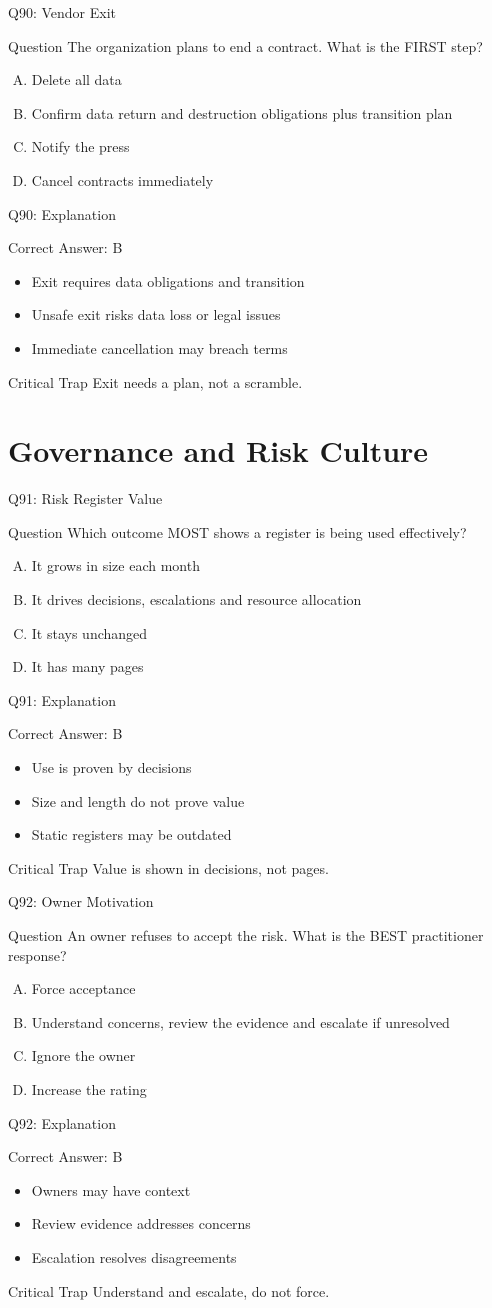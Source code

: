 \documentclass[aspectratio=169]{beamer}
\newcommand{\hq}[7]{%
	\begin{frame}{Q#1: #2}
		\begin{block}{Question}
			#3
		\end{block}
		\begin{enumerate}[(A)]
			#4
		\end{enumerate}
	\end{frame}
	\begin{frame}{Q#1: Explanation}
		\begin{block}{Correct Answer: #5}
			\begin{itemize}
				#6
			\end{itemize}
		\end{block}
		\begin{alertblock}{Critical Trap}
			#7
		\end{alertblock}
	\end{frame}
}
\begin{document}
	\hq{90}{Vendor Exit}
	{The organization plans to end a contract. What is the FIRST step?}
	{\item Delete all data
		\item Confirm data return and destruction obligations plus transition plan
		\item Notify the press
		\item Cancel contracts immediately}
	{B}
	{\item Exit requires data obligations and transition
		\item Unsafe exit risks data loss or legal issues
		\item Immediate cancellation may breach terms}
	{Exit needs a plan, not a scramble.}
	
	\section{Governance and Risk Culture}
	
	\hq{91}{Risk Register Value}
	{Which outcome MOST shows a register is being used effectively?}
	{\item It grows in size each month
		\item It drives decisions, escalations and resource allocation
		\item It stays unchanged
		\item It has many pages}
	{B}
	{\item Use is proven by decisions
		\item Size and length do not prove value
		\item Static registers may be outdated}
	{Value is shown in decisions, not pages.}
	
	\hq{92}{Owner Motivation}
	{An owner refuses to accept the risk. What is the BEST practitioner response?}
	{\item Force acceptance
		\item Understand concerns, review the evidence and escalate if unresolved
		\item Ignore the owner
		\item Increase the rating}
	{B}
	{\item Owners may have context
		\item Review evidence addresses concerns
		\item Escalation resolves disagreements}
	{Understand and escalate, do not force.}
	
\end{document}
